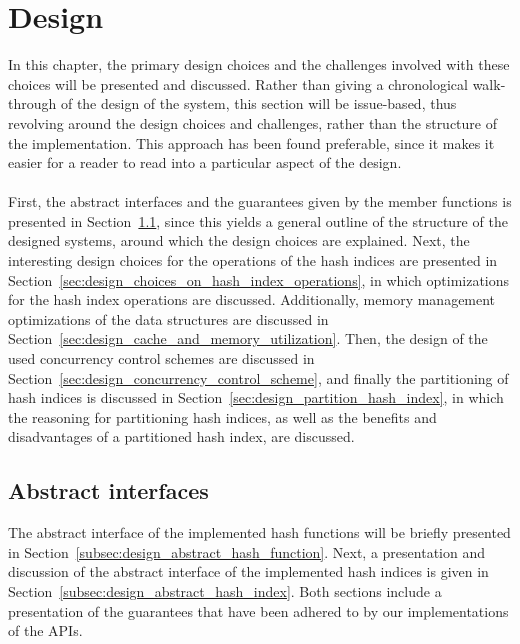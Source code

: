 \documentclass[11pt]{report} %
\begin{document}
\chapter{Design}
\label{chap:design}
In this chapter, the primary design choices and the challenges involved with these choices will be presented and discussed. Rather than giving a chronological walk-through of the design of the system, this section will be issue-based, thus revolving around the design choices and challenges, rather than the structure of the implementation. This approach has been found preferable, since it makes it easier for a reader to read into a particular aspect of the design.\\
\\
First, the abstract interfaces and the guarantees given by the member functions is presented in Section~\ref{sec:design_abstract_interfaces}, since this yields a general outline of the structure of the designed systems, around which the design choices are explained. Next, the interesting design choices for the operations of the hash indices are presented in Section~\ref{sec:design_choices_on_hash_index_operations}, in which optimizations for the hash index operations are discussed. Additionally, memory management optimizations of the data structures are discussed in Section~\ref{sec:design_cache_and_memory_utilization}. Then, the design of the used concurrency control schemes are discussed in Section~\ref{sec:design_concurrency_control_scheme}, and finally the partitioning of hash indices is discussed in Section~\ref{sec:design_partition_hash_index}, in which the reasoning for partitioning hash indices, as well as the benefits and disadvantages of a partitioned hash index, are discussed.
\section{Abstract interfaces}
\label{sec:design_abstract_interfaces}
The abstract interface of the implemented hash functions will be briefly presented in Section~\ref{subsec:design_abstract_hash_function}. Next, a presentation and discussion of the abstract interface of the implemented hash indices is given in Section~\ref{subsec:design_abstract_hash_index}. Both sections include a presentation of the guarantees that have been adhered to by our implementations of the APIs.
\end{document}
